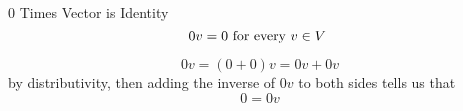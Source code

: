 \documentclass{standalone}
\begin{document}
\begin{theo*}{0 Times Vector is Identity}
  \[
  0 v =  0 \text{ for every $  v \in V$  } 
  \]
  \begin{pf}
   \[
   0v = \left( 0  +  0  \right)v =  0v  + 0v
   \]
   by distributivity, then adding the inverse of $ 0v$ to both sides tells us that
   \[
   0 =  0v
   \]
  \end{pf}
\end{theo*}
\end{document}
